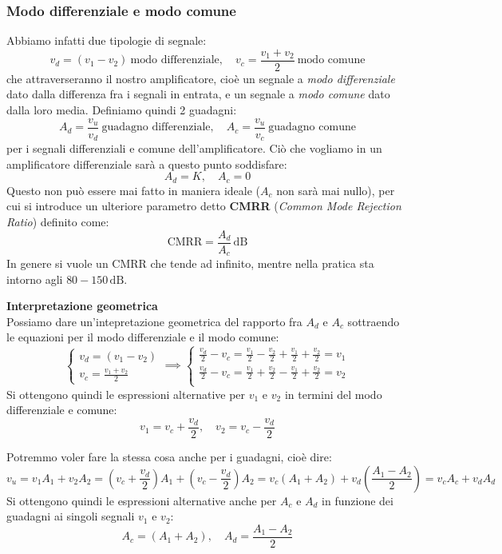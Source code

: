 \documentclass[a4paper,11pt]{article}
\begin{document}
\subsubsection{Modo differenziale e modo comune}
Abbiamo infatti due tipologie di segnale:
$$
v_d = (v_1 - v_2) \ \text{modo differenziale}, \quad v_c = \frac{v_1 + v_2}{2} \ \text{modo comune}
$$
che attraverseranno il nostro amplificatore, cioè un segnale a \textit{modo differenziale} dato dalla differenza fra i segnali in entrata, e un segnale a \textit{modo comune} dato dalla loro media. Definiamo quindi 2 guadagni:
$$
A_d = \frac{v_u}{v_d} \ \text{guadagno differenziale}, \quad A_c = \frac{v_u}{v_c} \ \text{guadagno comune}
$$
per i segnali differenziali e comune dell'amplificatore. Ciò che vogliamo in un amplificatore differenziale sarà a questo punto soddisfare:
$$
A_d = K, \quad A_c = 0
$$
Questo non può essere mai fatto in maniera ideale ($A_c$ non sarà mai nullo), per cui si introduce un ulteriore parametro detto \textbf{CMRR} (\textit{Common Mode Rejection Ratio}) definito come:
$$
\text{CMRR} = \frac{A_d}{A_c} \, \mathrm{dB}
$$
In genere si vuole un CMRR che tende ad infinito, mentre nella pratica sta intorno agli $80-150 \, \mathrm{dB}$.

\par\smallskip

\noindent
\textbf{\textsf{Interpretazione geometrica}} \\
\noindent
Possiamo dare un'intepretazione geometrica del rapporto fra $A_d$ e $A_c$ sottraendo le equazioni per il modo differenziale e il modo comune:
$$
\begin{cases}
	v_d = (v_1 - v_2) \\
	v_c = \frac{v_1 + v_2}{2}
\end{cases}
\implies
\begin{cases}
	\frac{v_d}{2} - v_c = \frac{v_1}{2} - \frac{v_2}{2} + \frac{v_1}{2} + \frac{v_2}{2} = v_1 \\
	\frac{v_d}{2} - v_c = \frac{v_1}{2} + \frac{v_2}{2} - \frac{v_1}{2} + \frac{v_2}{2} = v_2 \\
\end{cases}
$$
Si ottengono quindi le espressioni alternative per $v_1$ e $v_2$ in termini del modo differenziale e comune:
$$
v_1 = v_c + \frac{v_d}{2}, \quad  
v_2 = v_c - \frac{v_d}{2} 
$$

Potremmo voler fare la stessa cosa anche per i guadagni, cioè dire:
$$
v_u = v_1 A_1 + v_2 A_2 
= \left( v_c + \frac{v_d}{2} \right) A_1 + \left( v_c - \frac{v_d}{2} \right) A_2 
= v_c (A_1 + A_2) + v_d \left( \frac{A_1 - A_2}{2} \right) = v_c A_c + v_d A_d
$$
Si ottengono quindi le espressioni alternative anche per $A_c$ e $A_d$ in funzione dei guadagni ai singoli segnali $v_1$ e $v_2$:
$$
A_c = (A_1 + A_2), \quad A_d = \frac{A_1 - A_2}{2}
$$
\end{document}

